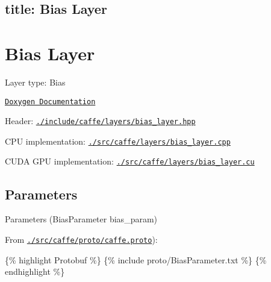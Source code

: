 

 \subsection*{title\+: Bias Layer }

\section*{Bias Layer}


\begin{DoxyItemize}
\item Layer type\+: {\ttfamily Bias}
\item \href{http://caffe.berkeleyvision.org/doxygen/classcaffe_1_1BiasLayer.html}{\tt Doxygen Documentation}
\item Header\+: \href{https://github.com/BVLC/caffe/blob/master/include/caffe/layers/bias_layer.hpp}{\tt {\ttfamily ./include/caffe/layers/bias\+\_\+layer.hpp}}
\item C\+PU implementation\+: \href{https://github.com/BVLC/caffe/blob/master/src/caffe/layers/bias_layer.cpp}{\tt {\ttfamily ./src/caffe/layers/bias\+\_\+layer.cpp}}
\item C\+U\+DA G\+PU implementation\+: \href{https://github.com/BVLC/caffe/blob/master/src/caffe/layers/bias_layer.cu}{\tt {\ttfamily ./src/caffe/layers/bias\+\_\+layer.cu}}
\end{DoxyItemize}

\subsection*{Parameters}


\begin{DoxyItemize}
\item Parameters ({\ttfamily Bias\+Parameter bias\+\_\+param})
\item From \href{https://github.com/BVLC/caffe/blob/master/src/caffe/proto/caffe.proto}{\tt {\ttfamily ./src/caffe/proto/caffe.proto}})\+:
\end{DoxyItemize}

\{\% highlight Protobuf \%\} \{\% include proto/\+Bias\+Parameter.\+txt \%\} \{\% endhighlight \%\} 
